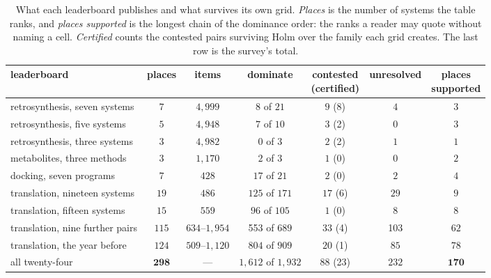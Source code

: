 \documentclass{article}
\begin{document}
\begin{table}[t]
\centering
\footnotesize
\setlength{\tabcolsep}{3.5pt}
\begin{tabular}{lcccccc}
\toprule
leaderboard & places & items & dominate & \shortstack{contested\\(certified)} & unresolved &
\shortstack{places\\supported} \\
\midrule
retrosynthesis, seven systems & $7$ & $4{,}999$ & $8$ of $21$ & $9$ (8) & $4$ & $3$ \\
retrosynthesis, five systems  & $5$ & $4{,}948$ & $7$ of $10$ & $3$ (2) & $0$ & $3$ \\
retrosynthesis, three systems & $3$ & $4{,}982$ & $0$ of $3$ & $2$ (2) & $1$ & $1$ \\
metabolites, three methods    & $3$ & $1{,}170$ & $2$ of $3$ & $1$ (0) & $0$ & $2$ \\
docking, seven programs       & $7$ & $428$ & $17$ of $21$ & $2$ (0) & $2$ & $4$ \\
translation, nineteen systems & $19$ & $486$ & $125$ of $171$ & $17$ (6) & $29$ & $9$ \\
translation, fifteen systems  & $15$ & $559$ & $96$ of $105$ & $1$ (0) & $8$ & $8$ \\
\midrule
translation, nine further pairs & $115$ & $634$--$1{,}954$ & 553 of $689$ & 33 (4) & 103 & $62$ \\
translation, the year before & $124$ & $509$--$1{,}120$ & $804$ of $909$ & $20$ (1) & $85$ & $78$ \\
\midrule
all twenty-four & $\mathbf{298}$ & --- & $1{,}612$ of $1{,}932$ & $88$ (23) & $232$ & $\mathbf{170}$ \\
\bottomrule
\end{tabular}
\caption{What each leaderboard publishes and what survives its own grid. \emph{Places} is the number
of systems the table ranks, and \emph{places supported} is the longest chain of the dominance order:
the ranks a reader may quote without naming a cell. \emph{Certified} counts the contested pairs
surviving Holm over the family each grid creates. The last row is the survey's total.}
\label{tab:robust}
\end{table}
\end{document}
